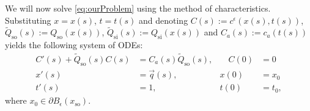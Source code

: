 \documentclass[paper=a4, fontsize=12pt,parskip=half,draft,headings=small]{scrartcl}
\newcommand{\Qso}{Q_{\mathrm{so}}}
\newcommand{\tQso}{\tilde{Q}_{\mathrm{so}}}
\newcommand{\Qsi}{Q_{\mathrm{si}}}
\newcommand{\tQsi}{\tilde{Q}_{\mathrm{si}}}
\newcommand{\q}{\vec{q}}
\newcommand{\xso}{x_\mathrm{so}}
\newcommand{\ce}{c^\epsilon}
\begin{document}
		\begin{remark}\label{rem:solC}
			We will now solve \eqref{eq:ourProblem} using the method of characteristics.
			Substituting $x = x(s)$, $t=t(s)$ and denoting $C(s):=\ce(x(s),t(s))$, $\tQso(s):=\Qso(x(s))$, $\tQsi(s):=\Qsi(x(s))$ and $C_a(s):=c_a(t(s))$  yields the following system of ODEs:
			\begin{subequations}
				\label{eq:ourODE}
				\begin{alignat}{2}
					C'(s) + \tQso(s)C(s) &= C_a(s)\tQso(s), & \quad C(0) &= 0 \label{eq:ourODEC} \\
					x'(s) &= \q(s), &x(0) &= x_0 \label{eq:ourODEx}\\
					t'(s) &= 1,     &t(0) &= t_0, \label{eq:ourODEt}
				\end{alignat}
			\end{subequations}
			where $x_0 \in \partial B_\epsilon(\xso)$.


\end{remark}
\end{document}
